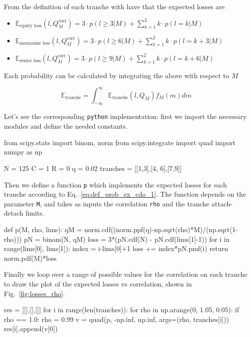 From the definition of each tranche with have that the expected losses are
\begin{itemize}
	\item $\mathbb{E}_{\textrm{equity loss}}(l, Q_M^{\textrm{corr}})=3\cdot p(l\ge 3|M) + \sum_{k=1}^{2}k\cdot p(l=k|M)$
	\item $\mathbb{E}_{\textrm{mezzanine loss}}(l, Q_M^{\textrm{corr}})=3\cdot p(l\ge 6|M) + \sum_{k=1}^{2}k\cdot p(l=k+3|M)$
	\item $\mathbb{E}_{\textrm{senior loss}}(l, Q_M^{\textrm{corr}})=3\cdot p(l\ge 9|M) + \sum_{k=1}^{2}k\cdot p(l=k+6|M)$
\end{itemize}
	
Each probability can be calculated by integrating the above with respect to $M$
	
\begin{equation} 
\mathbb{E}_{\mathrm{tranche}} = \int_{-\infty}^{\infty}{\mathbb{E}_{\mathrm{tranche}}(l, Q_M) f_M(m)dm}
\end{equation}

Let's see the corresponding \texttt{python} implementation:
first we import the necessary modules and define the needed constants.

\begin{ipython}
from scipy.stats import binom, norm
from scipy.integrate import quad
import numpy as np

N = 125
C = 1
R = 0
q = 0.02
tranches = [[1,3],[4, 6],[7,9]]
\end{ipython}

Then we define a function \texttt{p} which implements the expected losses for each tranche according to Eq.~\ref{eq:def_prob_ex_cdo_1}.
The function depends on the parameter \texttt{M}, and takes as inputs the correlation \texttt{rho} and the tranche attach-detach limits.
	
\begin{ipython}
def p(M, rho, lims):
    qM = norm.cdf((norm.ppf(q)-np.sqrt(rho)*M)/(np.sqrt(1-rho)))
    pN = binom(N, qM)
    loss = 3*(pN.cdf(N) - pN.cdf(lims[1]-1))
    for i in range(lims[0], lims[1]):
        index = i-lims[0]+1
        loss += index*pN.pmf(i)
    return norm.pdf(M)*loss
\end{ipython}

Finally we loop over a range of possible values for the correlation on each tranche to draw the plot of the expected losses vs correlation, shown in Fig.~\ref{fig:losses_rho}.

\begin{ipython}
res = [[],[],[]]
for i in range(len(tranches)):
    for rho in np.arange(0, 1.05, 0.05):
        if rho == 1.0:
            rho = 0.99
        v = quad(p, -np.inf, np.inf, args=(rho, tranches[i]))
        res[i].append(v[0])
\end{ipython}

